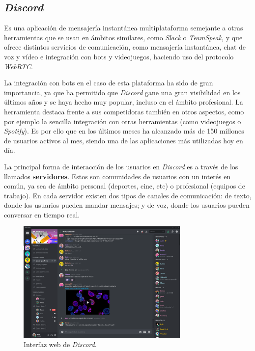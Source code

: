 \subsection{\textit{Discord}}

Es una aplicación de mensajería instantánea multiplataforma semejante a otras herramientas que se usan en ámbitos similares, como \textit{Slack} o \textit{TeamSpeak}, y que ofrece distintos servicios de comunicación, como mensajería instantánea, chat de voz y vídeo e integración con bots y videojuegos, haciendo uso del protocolo \textit{WebRTC}.

La integración con bots en el caso de esta plataforma ha sido de gran importancia, ya que ha permitido que \textit{Discord} gane una gran visibilidad en los últimos años y se haya hecho muy popular, incluso en el ámbito profesional. La herramienta destaca frente a sus competidoras también en otros aspectos\cite{earthweb}, como por ejemplo la sencilla integración con otras herramientas (como videojuegos o \textit{Spotify}). Es por ello que en los últimos meses ha alcanzado más de 150 millones de usuarios activos al mes, siendo una de las aplicaciones más utilizadas hoy en día.

La principal forma de interacción de los usuarios en \textit{Discord} es a través de los llamados \textbf{servidores}. Estos son  comunidades de usuarios con un interés en común, ya sea de ámbito personal (deportes, cine, etc) o profesional (equipos de trabajo). En cada servidor existen dos tipos de canales de comunicación: de texto, donde los usuarios pueden mandar mensajes; y de voz, donde los usuarios pueden conversar en tiempo real.

\begin{figure}[H]
	\centering
	\includegraphics[width=0.75\textwidth]{img/discord.png}
	\caption{Interfaz web de \textit{Discord}.}
\end{figure}



